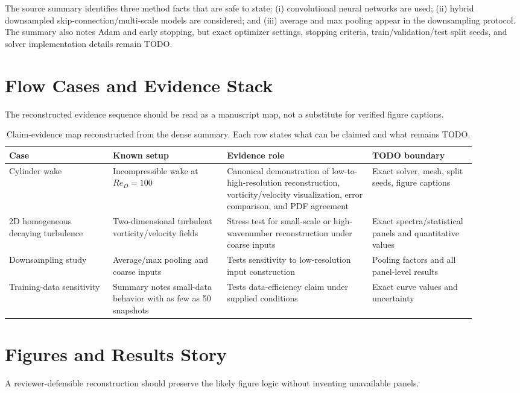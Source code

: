 \documentclass[11pt]{article}
\begin{document}
The source summary identifies three method facts that are safe to state: (i) convolutional neural networks are used; (ii) hybrid downsampled skip-connection/multi-scale models are considered; and (iii) average and max pooling appear in the downsampling protocol. The summary also notes Adam and early stopping, but exact optimizer settings, stopping criteria, train/validation/test split seeds, and solver implementation details remain TODO.

\section{Flow Cases and Evidence Stack}
The reconstructed evidence sequence should be read as a manuscript map, not a substitute for verified figure captions.

\begin{table}[h]
\centering
\small
\begin{tabular}{p{0.20\linewidth}p{0.22\linewidth}p{0.28\linewidth}p{0.20\linewidth}}
\toprule
Case & Known setup & Evidence role & TODO boundary \\
\midrule
Cylinder wake & Incompressible wake at $Re_D=100$ & Canonical demonstration of low-to-high-resolution reconstruction, vorticity/velocity visualization, error comparison, and PDF agreement & Exact solver, mesh, split seeds, figure captions \\
2D homogeneous decaying turbulence & Two-dimensional turbulent vorticity/velocity fields & Stress test for small-scale or high-wavenumber reconstruction under coarse inputs & Exact spectra/statistical panels and quantitative values \\
Downsampling study & Average/max pooling and coarse inputs & Tests sensitivity to low-resolution input construction & Pooling factors and all panel-level results \\
Training-data sensitivity & Summary notes small-data behavior with as few as 50 snapshots & Tests data-efficiency claim under supplied conditions & Exact curve values and uncertainty \\
\bottomrule
\end{tabular}
\caption{Claim-evidence map reconstructed from the dense summary. Each row states what can be claimed and what remains TODO.}
\end{table}

\section{Figures and Results Story}
A reviewer-defensible reconstruction should preserve the likely figure logic without inventing unavailable panels.
\end{document}
